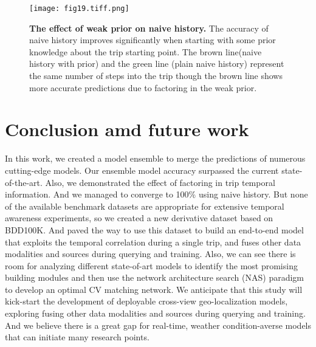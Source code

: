 \documentclass[10pt,letterpaper]{article}
\begin{document}
\begin{figure}[!h]
  \caption{{\bf The effect of weak prior on naive history.}  The accuracy of naive history improves significantly when starting with some prior knowledge about the trip starting point. The brown line(naive history with prior) and the green line (plain naive history) represent the same number of steps into the trip though the brown line shows more accurate predictions due to factoring in the weak prior.}
  \texttt{[image: fig19.tiff.png]}
  \label{fig19}
\end{figure}

\FloatBarrier
\section*{Conclusion amd future work}
In this work, we created a model ensemble to merge the predictions of numerous cutting-edge models. Our ensemble model accuracy surpassed the current state-of-the-art. Also, we demonstrated the effect of factoring in trip temporal information. And we managed to converge to 100\% using naive history. But none of the available benchmark datasets are appropriate for extensive temporal awareness experiments, so we created a new derivative dataset based on BDD100K. And paved the way to use this dataset to build an end-to-end model that exploits the temporal correlation during a single trip, and fuses other data modalities and sources during querying and training. Also, we can see there is room for analyzing different state-of-art models to identify the most promising building modules and then use the network architecture search (NAS) paradigm to develop an optimal CV matching network. We anticipate that this study will kick-start the development of deployable cross-view geo-localization models, exploring fusing other data modalities and sources during querying and training. And we believe there is a great gap for real-time, weather condition-averse models that can initiate many research points.

\nolinenumbers
\FloatBarrier
\end{document}
